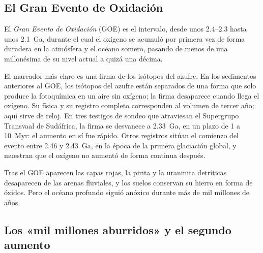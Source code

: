 \subsection*{El Gran Evento de Oxidación}

\begin{definition}\label{def:b2:precambrian-earth:goe}
El \emph{Gran Evento de Oxidación} (GOE) es el intervalo, desde unos
2.4--2.3 hasta unos \qty{2.1}{Ga}, durante el cual el oxígeno se acumuló por primera vez de forma duradera en la
atmósfera y el océano somero, pasando de menos de una millonésima de su nivel actual a
quizá una décima.
\end{definition}

El marcador más claro es una firma de los isótopos del azufre. En los sedimentos anteriores al GOE, los
isótopos del azufre están separados de una forma que solo produce la fotoquímica en un aire sin
oxígeno; la firma desaparece cuando llega el oxígeno. Su física y su registro completo corresponden
al volumen de tercer año; aquí sirve de reloj. En tres testigos de sondeo que atraviesan el Supergrupo
Transvaal de Sudáfrica, la firma se desvanece a \qty{2.33}{Ga}, en un plazo de 1 a \qty{10}{Myr}:
el aumento en sí fue rápido. Otros registros sitúan el comienzo del evento entre 2.46 y \qty{2.43}{Ga},
en la época de la primera glaciación global, y muestran que el oxígeno no aumentó de forma continua
después.

Tras el GOE aparecen las capas rojas, la pirita y la uraninita detríticas desaparecen de las arenas fluviales,
y los suelos conservan su hierro en forma de óxidos. Pero el océano profundo siguió anóxico durante más de mil millones
de años.

\subsection*{Los «mil millones aburridos» y el segundo aumento}

